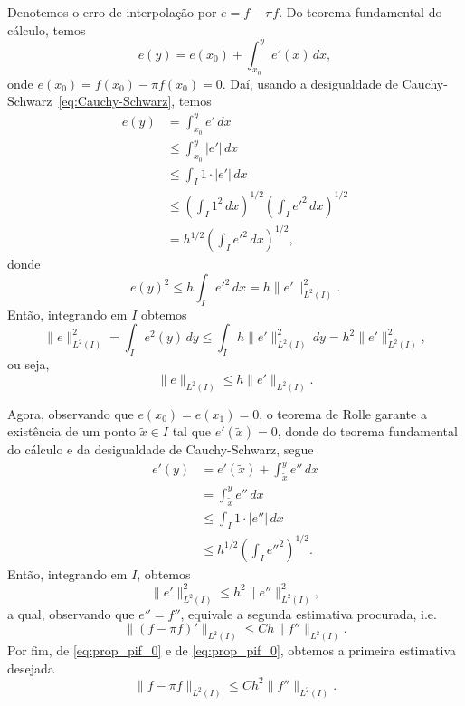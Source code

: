 \begin{dem}
  Denotemos o erro de interpolação por $e = f - \pi f$. Do teorema fundamental do cálculo, temos
  \begin{equation}
    e(y) = e(x_0) + \int_{x_0}^y e'(x)\,dx,
  \end{equation}
onde $e(x_0)=f(x_0)-\pi f(x_0) = 0$. Daí, usando a desigualdade de Cauchy-Schwarz~\eqref{eq:Cauchy-Schwarz}, temos
\begin{align}
  e(y) &= \int_{x_0}^y e'\,dx\\
       &\leq \int_{x_0}^y |e'|\,dx\\
       &\leq \int_{I} 1\cdot |e'|\,dx\\
       &\leq \left(\int_{I} 1^2\,dx\right)^{1/2} \left(\int_{I} e'^2\,dx\right)^{1/2}\\
       &= h^{1/2}\left(\int_{I} e'^2\,dx\right)^{1/2},
\end{align}
donde
\begin{equation}
  e(y)^2 \leq h\int_I e'^2\,dx = h\|e'\|_{L^2(I)}^2.
\end{equation}
Então, integrando em $I$ obtemos
\begin{equation}
  \|e\|_{L^2(I)}^2 = \int_I e^2(y)\,dy \leq \int_I h\|e'\|_{L^2(I)}^2\,dy = h^2\|e'\|_{L^2(I)}^2,
\end{equation}
ou seja,
\begin{equation}\label{eq:prop_pif_0}
  \|e\|_{L^2(I)} \leq h\|e'\|_{L^2(I)}.
\end{equation}

Agora, observando que $e(x_0)=e(x_1)=0$, o teorema de Rolle garante a existência de um ponto $\tilde{x}\in I$ tal que $e'(\tilde{x})=0$, donde do teorema fundamental do cálculo e da desigualdade de Cauchy-Schwarz, segue
\begin{align}
  e'(y) &= e'(\tilde{x}) + \int_{\tilde{x}}^y e''\,dx \\
        &= \int_{\tilde{x}}^y e''\,dx\\
        &\leq \int_{I}1\cdot |e''|\,dx\\
        &\leq h^{1/2}\left(\int_I e''^2\right)^{1/2}.
\end{align}
Então, integrando em $I$, obtemos
\begin{equation}\label{eq:prop_pif_1}
  \|e'\|_{L^2(I)}^2 \leq h^2\|e''\|_{L^2(I)}^2,
\end{equation}
a qual, observando que $e'' = f''$, equivale a segunda estimativa procurada, i.e.
\begin{equation}
  \|(f-\pi f)'\|_{L^2(I)} \leq C h \|f''\|_{L^2(I)}.
\end{equation}
Por fim, de \eqref{eq:prop_pif_0} e de \eqref{eq:prop_pif_0}, obtemos a primeira estimativa desejada
\begin{equation}
  \|f - \pi f\|_{L^2(I)} \leq C h^2 \|f''\|_{L^2(I)}.
\end{equation}
\end{dem}


